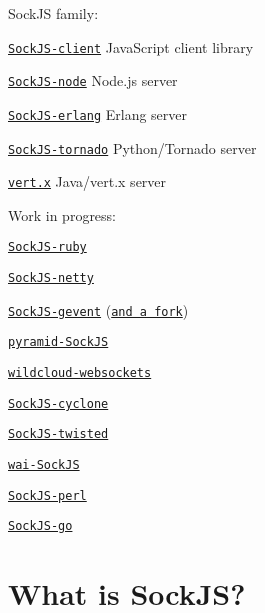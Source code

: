 \href{http://badge.fury.io/js/sockjs}{\tt }

Sock\+JS family\+:


\begin{DoxyItemize}
\item \href{https://github.com/sockjs/sockjs-client}{\tt Sock\+J\+S-\/client} Java\+Script client library
\item \href{https://github.com/sockjs/sockjs-node}{\tt Sock\+J\+S-\/node} Node.\+js server
\item \href{https://github.com/sockjs/sockjs-erlang}{\tt Sock\+J\+S-\/erlang} Erlang server
\item \href{https://github.com/MrJoes/sockjs-tornado}{\tt Sock\+J\+S-\/tornado} Python/\+Tornado server
\item \href{https://github.com/eclipse/vert.x}{\tt vert.\+x} Java/vert.\+x server
\end{DoxyItemize}

Work in progress\+:


\begin{DoxyItemize}
\item \href{https://github.com/nyarly/sockjs-ruby}{\tt Sock\+J\+S-\/ruby}
\item \href{https://github.com/cgbystrom/sockjs-netty}{\tt Sock\+J\+S-\/netty}
\item \href{https://github.com/sdiehl/sockjs-gevent}{\tt Sock\+J\+S-\/gevent} (\href{https://github.com/njoyce/sockjs-gevent}{\tt and a fork})
\item \href{https://github.com/fafhrd91/pyramid_sockjs}{\tt pyramid-\/\+Sock\+JS}
\item \href{https://github.com/wildcloud/wildcloud-websockets}{\tt wildcloud-\/websockets}
\item \href{https://github.com/flaviogrossi/sockjs-cyclone}{\tt Sock\+J\+S-\/cyclone}
\item \href{https://github.com/Fugiman/sockjs-twisted/}{\tt Sock\+J\+S-\/twisted}
\item \href{https://github.com/Palmik/wai-sockjs}{\tt wai-\/\+Sock\+JS}
\item \href{https://github.com/vti/sockjs-perl}{\tt Sock\+J\+S-\/perl}
\item \href{https://github.com/igm/sockjs-go/}{\tt Sock\+J\+S-\/go}
\end{DoxyItemize}

\section*{What is Sock\+JS? }

